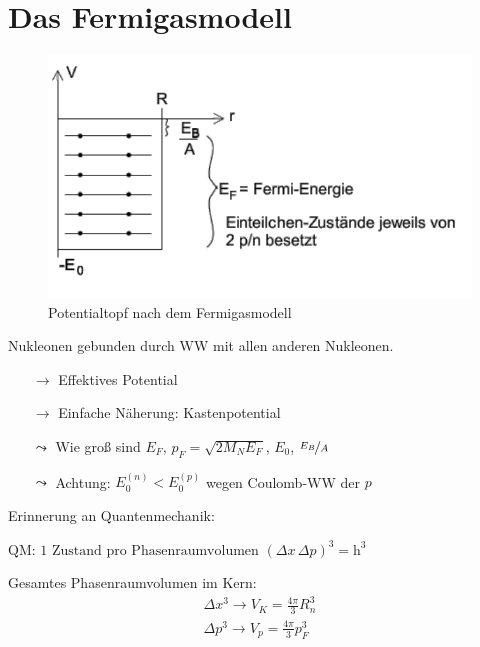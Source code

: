 \section{Das Fermigasmodell}
\begin{figure}[!ht]
\centering
\includegraphics[width=.5\textwidth]{imgs/ep5-fig-4-8.pdf}
\caption{Potentialtopf nach dem Fermigasmodell \label{fig:4.8}}
\end{figure}
Nukleonen gebunden durch WW mit allen anderen Nukleonen.
\begin{itemize}
\item[$\rightarrow$] Effektives Potential
\item[$\rightarrow$] Einfache Näherung: Kastenpotential
\item[$\leadsto$] Wie groß sind $E_F$, $p_F= \sqrt{2M_NE_F}$, $E_0$, $\nicefrac{E_B}{A}$
\item[$\leadsto$] Achtung: $E_0^{(n)} < E_0^{(p)}$ wegen Coulomb-WW der $p$
\end{itemize}
Erinnerung an Quantenmechanik:
\begin{center}
$\boxed{\text{QM: 1 Zustand pro Phasenraumvolumen }(\Delta x\, \Delta p)^3 = \mathrm{h}^3}$
\end{center}
Gesamtes Phasenraumvolumen im Kern:
\begin{align}
\Delta x^3 \rightarrow V_K = \frac{4 \pi}{3} R_n^3\\\Delta p^3 \rightarrow V_p = \frac{4 \pi}{3}p_F^3
\end{align}
